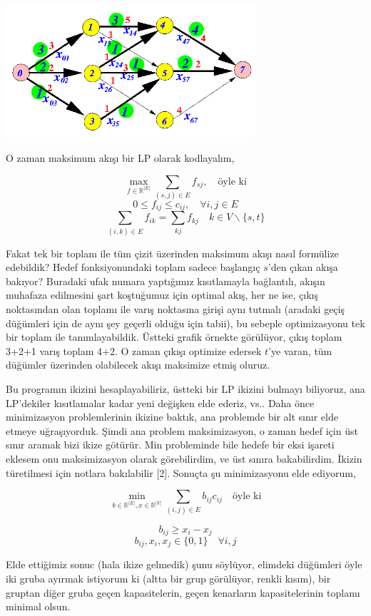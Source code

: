\documentclass[12pt,fleqn]{article}\usepackage{../../common}
\begin{document}
\includegraphics[width=25em]{func_55_duality_02.png}

O zaman maksimum akışı bir LP olarak kodlayalım,

$$
\max_{f \in \mathbb{R}^{|E|}} \sum_{(s,j)\in E} f_{sj}, \quad \textrm{öyle ki}
$$
$$
0 \le f_{ij} \le c_{ij}, \quad \forall i,j \in E
$$
$$
\sum_{(i,k) \in E} f_{ik} = \sum_{kj} f_{kj} \quad k \in V \backslash \{s,t\} 
$$

Fakat tek bir toplam ile tüm çizit üzerinden maksimum akışı nasıl formülize
edebildik? Hedef fonksiyonundaki toplam sadece başlangıç $s$'den çıkan
akışa bakıyor? Buradaki ufak numara yaptığımız kısıtlamayla bağlantılı,
akışın muhafaza edilmesini şart koştuğumuz için optimal akış, her ne ise,
çıkış noktasından olan toplamı ile varış noktasına girişi aynı tutmalı
(aradaki geçiş düğümleri için de aynı şey geçerli olduğu için tabii), bu
sebeple optimizasyonu tek bir toplam ile tanımlayabildik. Üstteki grafik
örnekte görülüyor, çıkış toplam 3+2+1 varış toplam 4+2. O zaman çıkışı
optimize edersek $t$'ye varan, tüm düğümler üzerinden olabilecek akışı
maksimize etmiş oluruz.

Bu programın ikizini hesaplayabiliriz, üstteki bir LP ikizini bulmayı
biliyoruz, ana LP'dekiler kısıtlamalar kadar yeni değişken elde ederiz,
vs.. Daha önce minimizasyon problemlerinin ikizine baktık, ana problemde
bir alt sınır elde etmeye uğraşıyorduk. Şimdi ana problem maksimizasyon, o
zaman hedef için üst sınır aramak bizi ikize götürür. Min probleminde bile
hedefe bir eksi işareti eklesem onu maksimizasyon olarak görebilirdim, ve
üst sınıra bakabilirdim. İkizin türetilmesi için notlara bakılabilir
[2]. Sonuçta şu minimizasyonu elde ediyorum,

$$
\min_{b \in \mathbb{R}^{|E|}, x \in \mathbb{R}^{|V|}} 
\sum_{(i,j) \in E} b_{ij} c_{ij} \quad \textrm{öyle ki}
$$

$$
b_{ij} \ge x_i - x_j
$$
$$
b_{ij}, x_i,x_j \in \{ 0,1\} \quad \forall i,j
$$

Elde ettiğimiz sonuc (hala ikize gelmedik) şunu söylüyor, elimdeki
düğümleri öyle iki gruba ayırmak istiyorum ki (altta bir grup görülüyor,
renkli kısım), bir gruptan diğer gruba geçen kapasitelerin, geçen
kenarların kapasitelerinin toplamı minimal olsun.
\end{document}
